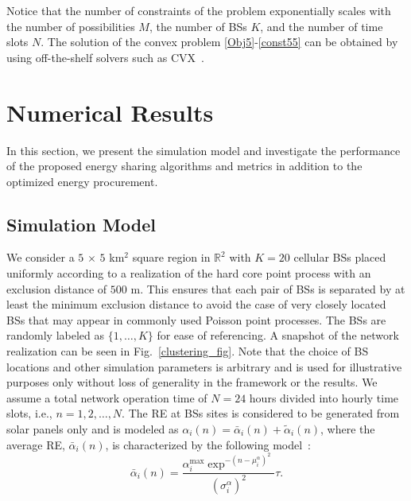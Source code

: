 \documentclass[10pt, letter,twocolumn]{IEEEtran}
\begin{document}
Notice that the number of constraints of the problem exponentially scales with the number of possibilities $M$, the number of BSs $K$, and the number of time slots $N$. The solution of the convex problem \eqref{Obj5}-\eqref{const55} can be obtained by using off-the-shelf solvers such as CVX~\cite{cvx}.

\vspace{-0.0cm}
\section{Numerical Results} \label{sec_results}
In this section, we present the simulation model and investigate the performance of the proposed energy sharing algorithms and metrics in addition to the optimized energy procurement.
\vspace{-0.0in}
\subsection{Simulation Model} \label{sim_parameters}
We consider a $5$ $\times$ $5$ km$^2$ square region in $\mathbb{R}^{2}$ with $K = 20$ cellular BSs placed uniformly according to a realization of the hard core point process with an exclusion distance of $500$ m. This ensures that each pair of BSs is separated by at least the minimum exclusion distance to avoid the case of very closely located BSs that may appear in commonly used Poisson point processes. The BSs are randomly labeled as $\{1,\ldots,K\}$ for ease of referencing. A snapshot of the network realization can be seen in Fig.~\ref{clustering_fig}. Note that the choice of BS locations and other simulation parameters is arbitrary and is used for illustrative purposes only without loss of generality in the framework or the results. We assume a total network operation time of $N = 24$ hours divided into hourly time slots, i.e., $n = 1,2, \ldots, N$. The RE at BSs sites is considered to be generated from solar panels only and is modeled as $\alpha_{i}(n) = \bar{\alpha}_{i}(n) + \tilde{\alpha}_{i}(n)$, where the average RE, $\bar{\alpha}_{i}(n)$, is characterized by the following model~\cite{solar_generation}:
\vspace{-0.0cm}
\begin{equation}\label{alpha_bar}
  \bar{\alpha}_{i}(n) = \frac{\alpha_{i}^{\max} \exp^{-(n - \mu^{\alpha}_{i})^{2}}}{(\sigma^{\alpha}_{i})^2}\tau.
\end{equation}
\end{document}
